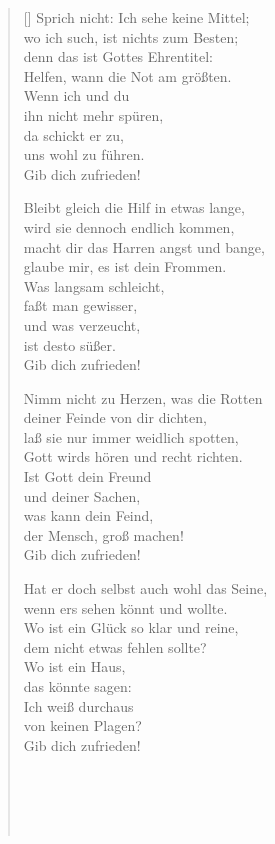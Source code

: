 \begin{multicols}{2}
\begin{verse}[\versewidth]
 Sprich nicht: Ich sehe keine Mittel;\\
wo ich such, ist nichts zum Besten;\\
denn das ist Gottes Ehrentitel:\\
Helfen, wann die Not am größten.\\
Wenn ich und du\\
ihn nicht mehr spüren,\\
da schickt er zu,\\
uns wohl zu führen.\\
Gib dich zufrieden!

 Bleibt gleich die Hilf in etwas lange,\\
wird sie dennoch endlich kommen,\\
macht dir das Harren angst und bange,\\
glaube mir, es ist dein Frommen.\\
Was langsam schleicht,\\
faßt man gewisser,\\
und was verzeucht,\\
ist desto süßer.\\
Gib dich zufrieden!

 Nimm nicht zu Herzen, was die Rotten\\
deiner Feinde von dir dichten,\\
laß sie nur immer weidlich spotten,\\
Gott wirds hören und recht richten.\\
Ist Gott dein Freund\\
und deiner Sachen,\\
was kann dein Feind,\\
der Mensch, groß machen!\\
Gib dich zufrieden!

 Hat er doch selbst auch wohl das Seine,\\
wenn ers sehen könnt und wollte.\\
Wo ist ein Glück so klar und reine,\\
dem nicht etwas fehlen sollte?\\
Wo ist ein Haus,\\
das könnte sagen:\\
Ich weiß durchaus\\
von keinen Plagen?\\
Gib dich zufrieden!

\begin{verbatim}





\end{verbatim}
\end{verse}
\end{multicols}
